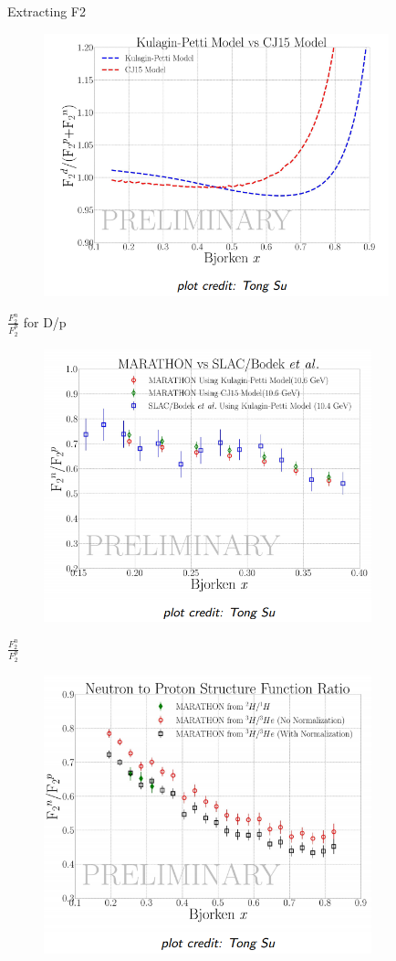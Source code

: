 \documentclass{beamer}
\begin{document}
\begin{frame}{Extracting F2}
\vspace{-10pt}
\begin{figure}
	\includegraphics[width=10cm]{../images/kp_cj.png}
\end{figure}
\end{frame}


\begin{frame}{$\frac{F_2^n}{F_2^p}$ for D/p}
\vspace{-20pt}
\begin{figure}
	\includegraphics[width=9.5cm]{../images/ff_al.png}
\end{figure}
\end{frame}

\begin{frame}{$\frac{F_2^n}{F_2^p}$}
\vspace{-20pt}
\begin{figure}
	\includegraphics[width=9.5cm]{../images/fff.png}
\end{figure}
\end{frame}
\end{document}
